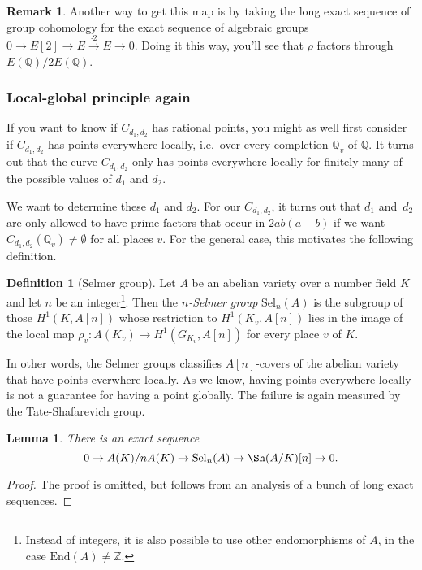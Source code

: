 \documentclass[12pt]{article}
\newtheorem{lemma}[theorem]{Lemma}
\theoremstyle{definition}
\newtheorem{definition}[theorem]{Definition}
\newtheorem{remark}[theorem]{Remark}
\numberwithin{equation}{subsection}
\newcommand{\Q}{\ensuremath{\mathbb{Q}}}
\newcommand{\Z}{\ensuremath{\mathbb{Z}}}
\begin{document}
\begin{remark}
Another way to get this map is by taking the long exact sequence of group cohomology for the exact sequence of algebraic groups $0 \to E[2] \to E \stackrel{\cdot 2}{\to} E \to 0$. Doing it this way, you'll see that $\rho$ factors through $E(\Q) / 2E(\Q)$.
\end{remark}

\subsubsection{Local-global principle again}

If you want to know if $C_{d_1,d_2}$ has rational points, you might as well first consider if $C_{d_1,d_2}$ has points everywhere locally, i.e.\ over every completion $\Q_v$ of $\Q$.
It turns out that the curve $C_{d_1,d_2}$ only has points everywhere locally for finitely many of the possible values of $d_1$ and $d_2$.

We want to determine these $d_1$ and $d_2$.
For our $C_{d_1,d_2}$, it turns out that $d_1$ and~$d_2$ are only allowed to have prime factors that occur in $2ab(a-b)$ if we want $C_{d_1,d_2}(\Q_v) \neq \emptyset$ for all places $v$.
For the general case, this motivates the following definition.

\begin{definition}[Selmer group]
Let $A$ be an abelian variety over a number field $K$ and let $n$ be an integer\footnote{Instead of integers, it is also possible to use other endomorphisms of $A$, in the case $\mathrm{End}(A) \neq \Z$.}. Then the {\em $n$-Selmer group} $\mathrm{Sel}_n(A)$ is the subgroup of those $H^1(K, A[n])$ whose restriction to $H^1(K_v, A[n])$ lies in the image of the local map $\rho_v \colon A(K_v) \to H^1(G_{K_v}, A[n])$ for every place $v$ of $K$.
\end{definition}

In other words, the Selmer groups classifies $A[n]$-covers of the abelian variety that have points everwhere locally.
As we know, having points everywhere locally is not a guarantee for having a point globally.
The failure is again measured by the Tate-Shafarevich group.

\begin{lemma}
There is an exact sequence
$$0 \to A(K)/nA(K) \to \mathrm{Sel}_n(A) \to \Sh(A/K)[n] \to 0.$$
\end{lemma}

\begin{proof}
The proof is omitted, but follows from an analysis of a bunch of long exact sequences.
\end{proof}
\end{document}
